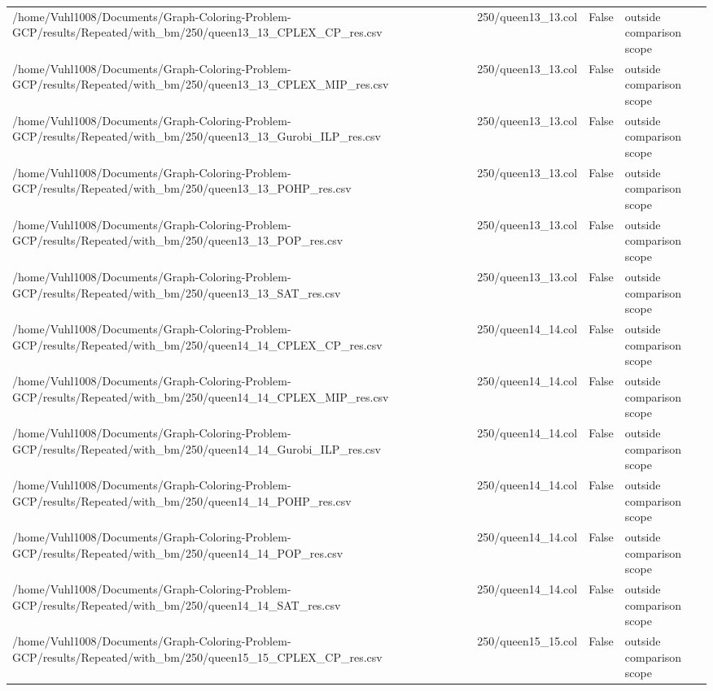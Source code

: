\begin{table}[htbp]
\begin{tabular}{llll}
/home/Vuhl1008/Documents/Graph-Coloring-Problem-GCP/results/Repeated/with\_bm/250/queen13\_13\_CPLEX\_CP\_res.csv & 250/queen13\_13.col & False & outside comparison scope \\
/home/Vuhl1008/Documents/Graph-Coloring-Problem-GCP/results/Repeated/with\_bm/250/queen13\_13\_CPLEX\_MIP\_res.csv & 250/queen13\_13.col & False & outside comparison scope \\
/home/Vuhl1008/Documents/Graph-Coloring-Problem-GCP/results/Repeated/with\_bm/250/queen13\_13\_Gurobi\_ILP\_res.csv & 250/queen13\_13.col & False & outside comparison scope \\
/home/Vuhl1008/Documents/Graph-Coloring-Problem-GCP/results/Repeated/with\_bm/250/queen13\_13\_POHP\_res.csv & 250/queen13\_13.col & False & outside comparison scope \\
/home/Vuhl1008/Documents/Graph-Coloring-Problem-GCP/results/Repeated/with\_bm/250/queen13\_13\_POP\_res.csv & 250/queen13\_13.col & False & outside comparison scope \\
/home/Vuhl1008/Documents/Graph-Coloring-Problem-GCP/results/Repeated/with\_bm/250/queen13\_13\_SAT\_res.csv & 250/queen13\_13.col & False & outside comparison scope \\
/home/Vuhl1008/Documents/Graph-Coloring-Problem-GCP/results/Repeated/with\_bm/250/queen14\_14\_CPLEX\_CP\_res.csv & 250/queen14\_14.col & False & outside comparison scope \\
/home/Vuhl1008/Documents/Graph-Coloring-Problem-GCP/results/Repeated/with\_bm/250/queen14\_14\_CPLEX\_MIP\_res.csv & 250/queen14\_14.col & False & outside comparison scope \\
/home/Vuhl1008/Documents/Graph-Coloring-Problem-GCP/results/Repeated/with\_bm/250/queen14\_14\_Gurobi\_ILP\_res.csv & 250/queen14\_14.col & False & outside comparison scope \\
/home/Vuhl1008/Documents/Graph-Coloring-Problem-GCP/results/Repeated/with\_bm/250/queen14\_14\_POHP\_res.csv & 250/queen14\_14.col & False & outside comparison scope \\
/home/Vuhl1008/Documents/Graph-Coloring-Problem-GCP/results/Repeated/with\_bm/250/queen14\_14\_POP\_res.csv & 250/queen14\_14.col & False & outside comparison scope \\
/home/Vuhl1008/Documents/Graph-Coloring-Problem-GCP/results/Repeated/with\_bm/250/queen14\_14\_SAT\_res.csv & 250/queen14\_14.col & False & outside comparison scope \\
/home/Vuhl1008/Documents/Graph-Coloring-Problem-GCP/results/Repeated/with\_bm/250/queen15\_15\_CPLEX\_CP\_res.csv & 250/queen15\_15.col & False & outside comparison scope \\

\end{tabular}
\end{table}
